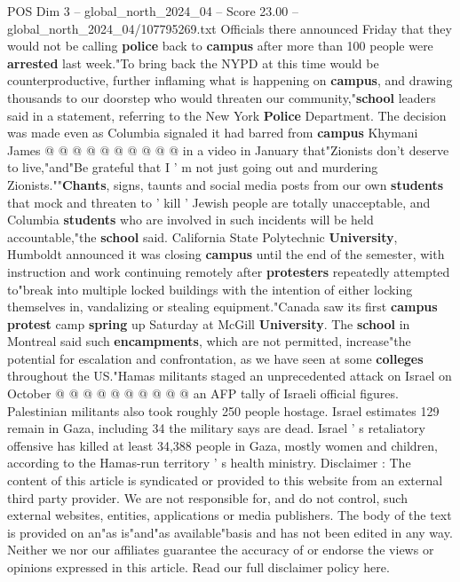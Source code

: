 \begin{textsample}{POS Dim 3 – global\_north\_2024\_04 – Score 23.00 – global\_north\_2024\_04/107795269.txt}
Officials there announced Friday that they would not be calling \textbf{police} back to \textbf{campus} after more than 100 people were \textbf{arrested} last week."To bring back the NYPD at this time would be counterproductive, further inflaming what is happening on \textbf{campus}, and drawing thousands to our doorstep who would threaten our community,"\textbf{school} leaders said in a statement, referring to the New York \textbf{Police} Department.
The decision was made even as Columbia signaled it had barred from \textbf{campus} Khymani James @ @ @ @ @ @ @ @ @ @ in a video in January that"Zionists don't deserve to live,"and"Be grateful that I ' m not just going out and murdering Zionists.""\textbf{Chants}, signs, taunts and social media posts from our own \textbf{students} that mock and threaten to ' kill ' Jewish people are totally unacceptable, and Columbia \textbf{students} who are involved in such incidents will be held accountable,"the \textbf{school} said.
California State Polytechnic \textbf{University}, Humboldt announced it was closing \textbf{campus} until the end of the semester, with instruction and work continuing remotely after \textbf{protesters} repeatedly attempted to"break into multiple locked buildings with the intention of either locking themselves in, vandalizing or stealing equipment."Canada saw its first \textbf{campus} \textbf{protest} camp \textbf{spring} up Saturday at McGill \textbf{University}.
The \textbf{school} in Montreal said such \textbf{encampments}, which are not permitted, increase"the potential for escalation and confrontation, as we have seen at some \textbf{colleges} throughout the US."Hamas militants staged an unprecedented attack on Israel on October @ @ @ @ @ @ @ @ @ @ an AFP tally of Israeli official figures.
Palestinian militants also took roughly 250 people hostage.
Israel estimates 129 remain in Gaza, including 34 the military says are dead.
Israel ' s retaliatory offensive has killed at least 34,388 people in Gaza, mostly women and children, according to the Hamas-run territory ' s health ministry.
Disclaimer : The content of this article is syndicated or provided to this website from an external third party provider.
We are not responsible for, and do not control, such external websites, entities, applications or media publishers.
The body of the text is provided on an"as is"and"as available"basis and has not been edited in any way.
Neither we nor our affiliates guarantee the accuracy of or endorse the views or opinions expressed in this article.
Read our full disclaimer policy here.

\end{textsample}
